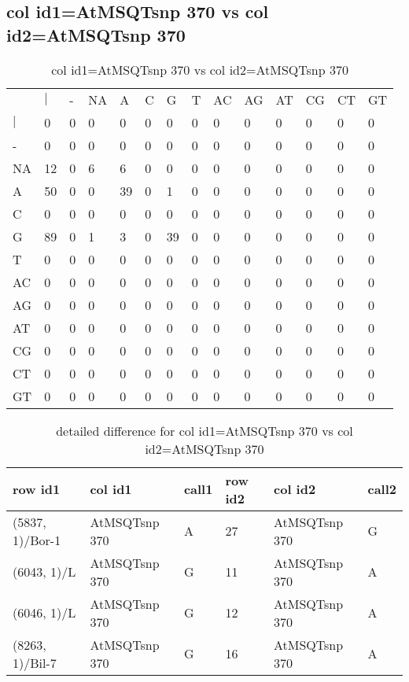 \subsection{col id1=AtMSQTsnp 370 vs col id2=AtMSQTsnp 370}
\begin{center}
\begin{longtable}{|l|l|l|l|l|l|l|l|l|l|l|l|l|l|}
\caption{col id1=AtMSQTsnp 370 vs col id2=AtMSQTsnp 370} \label{table_dm694}\\
\hline
\\
\hline
&$|$&-&NA&A&C&G&T&AC&AG&AT&CG&CT&GT\\
$|$&0&0&0&0&0&0&0&0&0&0&0&0&0\\
-&0&0&0&0&0&0&0&0&0&0&0&0&0\\
NA&12&0&6&6&0&0&0&0&0&0&0&0&0\\
A&50&0&0&39&0&1&0&0&0&0&0&0&0\\
C&0&0&0&0&0&0&0&0&0&0&0&0&0\\
G&89&0&1&3&0&39&0&0&0&0&0&0&0\\
T&0&0&0&0&0&0&0&0&0&0&0&0&0\\
AC&0&0&0&0&0&0&0&0&0&0&0&0&0\\
AG&0&0&0&0&0&0&0&0&0&0&0&0&0\\
AT&0&0&0&0&0&0&0&0&0&0&0&0&0\\
CG&0&0&0&0&0&0&0&0&0&0&0&0&0\\
CT&0&0&0&0&0&0&0&0&0&0&0&0&0\\
GT&0&0&0&0&0&0&0&0&0&0&0&0&0\\
\hline
\end{longtable}
\end{center}

\begin{center}
\begin{longtable}{|l|l|l|l|l|l|}
\caption{detailed difference for col id1=AtMSQTsnp 370 vs col id2=AtMSQTsnp 370} \label{table_dm695}\\
\hline
row id1&col id1&call1&row id2&col id2&call2\\
\hline
(5837, 1)/Bor-1&AtMSQTsnp 370&A&27&AtMSQTsnp 370&G\\
(6043, 1)/L&AtMSQTsnp 370&G&11&AtMSQTsnp 370&A\\
(6046, 1)/L&AtMSQTsnp 370&G&12&AtMSQTsnp 370&A\\
(8263, 1)/Bil-7&AtMSQTsnp 370&G&16&AtMSQTsnp 370&A\\
\hline
\end{longtable}
\end{center}

